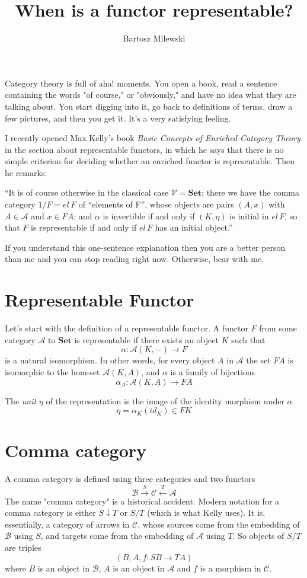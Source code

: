 \documentclass[11pt]{amsart}
\author{Bartosz Milewski}
\title{When is a functor representable?}
\newcommand{\Cat}[1]{\mathbf{#1}}
\newcommand{\cat}[1]{\mathcal{#1}}
\begin{document}
\maketitle{}
Category theory is full of aha! moments. You open a book, read a sentence containing the words "of course," or "obviously," and have no idea what they are talking about. You start digging into it, go back to definitions of terms, draw a few pictures, and then you get it. It's a very satisfying feeling. 

I recently opened Max Kelly's book \emph{Basic Concepts of Enriched Category Theory} in the section about representable functors, in which he says that there is no simple criterion for deciding whether an enriched functor is representable. Then he remarks: 

``It is of course otherwise in the classical case $\cat V = \Cat{Set}$; there we have the comma category $1/F = el \,F$  of ``elements of F'', whose objects are pairs $(A, x)$ with $A \in \cat A$ and $x \in F A$; and $\alpha$ is invertible if and only if $(K, \eta)$ is initial in $el \, F$, so that $F$ is representable if and only if $el \, F$ has an initial object.''

If you understand this one-sentence explanation then you are a better person than me and you can stop reading right now. Otherwise, bear with me.

\section{Representable Functor}

Let's start with the definition of a representable functor. A functor $F$ from some category $\cat A$ to $\Cat{Set}$ is representable if there exists an object $K$ such that 
\[ \alpha \colon \cat A (K, -) \to F\]
is a natural isomorphism. In other words, for every object $A$ in $\cat A$ the set $F A$ is isomorphic to the hom-set $\cat A (K, A)$, and $\alpha$ is a family of bijections
\[\alpha_A \colon \cat{A} (K, A) \to F A\]

The \emph{unit} $\eta$ of the representation is the image of the identity morphism under $\alpha$
\[\eta = \alpha_K (id_K) \in F K\]

\section{Comma category}

A comma category is defined using three categories and two functors
\[ \cat B \xrightarrow{S} \cat C \xleftarrow{T} \cat A \]
 The name "comma category" is a historical accident. Modern notation for a comma category is either $S \downarrow T$ or $S / T$ (which is what Kelly uses). It is, essentially, a category of arrows in $\cat C$, whose sources come from the embedding of $\cat B$ using $S$, and targets come from  the embedding of $\cat A$ using $T$. So objects of $S / T$ are triples
 \[(B, A, f \colon S B \to T A)\]
 where $B$ is an object in $\cat B$, $A$ is an object in $\cat A$ and $f$ is a morphism in $\cat C$. 
 
\end{document}
